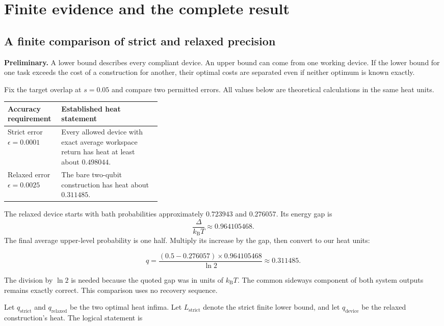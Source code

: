 \documentclass[11pt,letterpaper]{article}
\begin{document}
\section{Finite evidence and the complete result}\label{sec:evidence}

\subsection{A finite comparison of strict and relaxed precision}\label{subsec:finite-comparison}

\textbf{Preliminary.} A lower bound describes every compliant device. An upper bound can come from one working device. If the lower bound for one task exceeds the cost of a construction for another, their optimal costs are separated even if neither optimum is known exactly.

Fix the target overlap at \(s = 0.05\) and compare two permitted errors. All values below are theoretical calculations in the same heat units.

\begin{center}
\begin{tabularx}{\linewidth}{@{}p{0.35\linewidth}X@{}}
\toprule
\textbf{Accuracy requirement} & \textbf{Established heat statement}\\
\midrule
Strict error $\epsilon=0.0001$ & Every allowed device with exact average workspace return has heat at least about $0.498044$.\\[3pt]
Relaxed error $\epsilon=0.0025$ & The bare two-qubit construction has heat about $0.311485$.\\
\bottomrule
\end{tabularx}
\end{center}

The relaxed device starts with bath probabilities approximately \(0.723943\) and \(0.276057\). Its energy gap is
\[\frac{\Delta}{k_{\mathrm{B}}T}\approx 0.964105468.\]
The final average upper-level probability is one half. Multiply its increase by the gap, then convert to our heat units:

\[q = \frac{(0.5 - 0.276057) \times 0.964105468}{\ln 2} \approx 0.311485.\]

The division by \(\ln 2\) is needed because the quoted gap was in units of \(k_{\mathrm{B}}T\). The common sideways component of both system outputs remains exactly correct. This comparison uses no recovery sequence.

Let \(q_{\mathrm{strict}}\) and \(q_{\mathrm{relaxed}}\) be the two optimal heat infima. Let \(L_{\mathrm{strict}}\) denote the strict finite lower bound, and let \(q_{\mathrm{device}}\) be the relaxed construction's heat. The logical statement is
\end{document}
